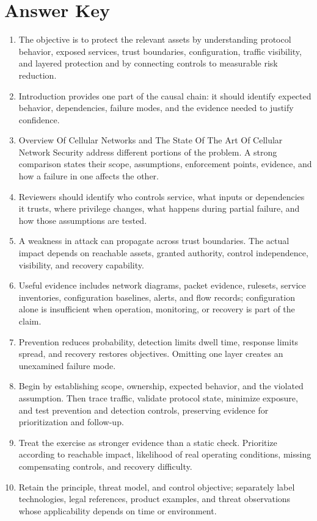 \documentclass[11pt,letterpaper]{article}
\begin{document}
\section*{Answer Key}
\begin{enumerate}
\item The objective is to protect the relevant assets by understanding protocol behavior, exposed services, trust boundaries, configuration, traffic visibility, and layered protection and by connecting controls to measurable risk reduction.
\item Introduction provides one part of the causal chain: it should identify expected behavior, dependencies, failure modes, and the evidence needed to justify confidence.
\item Overview Of Cellular Networks and The State Of The Art Of Cellular Network Security address different portions of the problem. A strong comparison states their scope, assumptions, enforcement points, evidence, and how a failure in one affects the other.
\item Reviewers should identify who controls service, what inputs or dependencies it trusts, where privilege changes, what happens during partial failure, and how those assumptions are tested.
\item A weakness in attack can propagate across trust boundaries. The actual impact depends on reachable assets, granted authority, control independence, visibility, and recovery capability.
\item Useful evidence includes network diagrams, packet evidence, rulesets, service inventories, configuration baselines, alerts, and flow records; configuration alone is insufficient when operation, monitoring, or recovery is part of the claim.
\item Prevention reduces probability, detection limits dwell time, response limits spread, and recovery restores objectives. Omitting one layer creates an unexamined failure mode.
\item Begin by establishing scope, ownership, expected behavior, and the violated assumption. Then trace traffic, validate protocol state, minimize exposure, and test prevention and detection controls, preserving evidence for prioritization and follow-up.
\item Treat the exercise as stronger evidence than a static check. Prioritize according to reachable impact, likelihood of real operating conditions, missing compensating controls, and recovery difficulty.
\item Retain the principle, threat model, and control objective; separately label technologies, legal references, product examples, and threat observations whose applicability depends on time or environment.
\end{enumerate}
\end{document}
